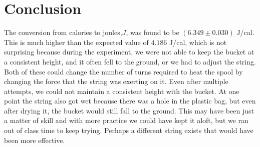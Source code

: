 \documentclass[12pt]{article}
\begin{document}
    \section{Conclusion}
        The conversion from calories to joules,\(J\), was found to be \((6.349 \pm 0.030 )\) J/cal. This is much higher than the expected value of \(4.186\) J/cal, which is not surprising because during the experiment, we were not able to keep the bucket at a consistent height, and it often fell to the ground, or we had to adjust the string. Both of these could change the number of turns required to heat the spool by changing the force that the string was exerting on it. Even after multiple attempts, we could not maintain a consistent height with the bucket. At one point the string also got wet because there was a hole in the plastic bag, but even after drying it, the bucket would still fall to the ground. This may have been just a matter of skill and with more practice we could have kept it aloft, but we ran out of class time to keep trying. Perhaps a different string exists that would have been more effective.
\end{document}
